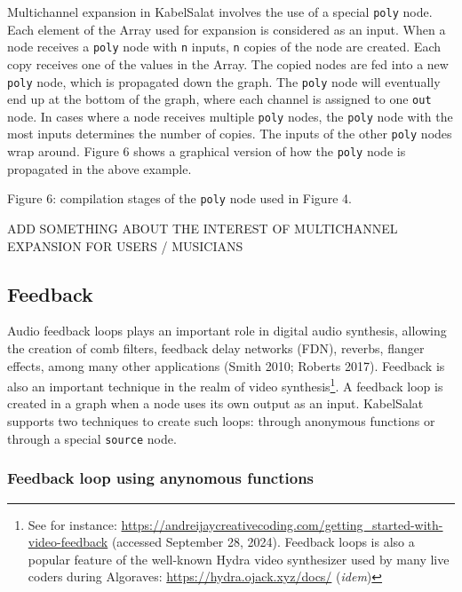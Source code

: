 \documentclass[11pt,]{article}
\makeatletter
\newcommand*\pandocbounded[1]{%
  \sbox\pandoc@box{#1}%
  \Gscale@div\@tempa{\textheight}{\dimexpr\ht\pandoc@box+\dp\pandoc@box\relax}%
  \Gscale@div\@tempb{\linewidth}{\wd\pandoc@box}%
  \ifdim\@tempb\p@<\@tempa\p@\let\@tempa\@tempb\fi%
  \ifdim\@tempa\p@<\p@\scalebox{\@tempa}{\usebox\pandoc@box}%
  \else\usebox{\pandoc@box}%
  \fi%
}
\makeatother
\begin{document}
Multichannel expansion in KabelSalat involves the use of a special
\texttt{poly} node. Each element of the Array used for expansion is
considered as an input. When a node receives a \texttt{poly} node with
\texttt{n} inputs, \texttt{n} copies of the node are created. Each copy
receives one of the values in the Array. The copied nodes are fed into a
new \texttt{poly} node, which is propagated down the graph. The
\texttt{poly} node will eventually end up at the bottom of the graph,
where each channel is assigned to one \texttt{out} node. In cases where
a node receives multiple \texttt{poly} nodes, the \texttt{poly} node
with the most inputs determines the number of copies. The inputs of the
other \texttt{poly} nodes wrap around. Figure 6 shows a graphical
version of how the \texttt{poly} node is propagated in the above
example.

\pandocbounded{\texttt{[image: images/mch.png]}} Figure
6: compilation stages of the \texttt{poly} node used in Figure 4.

ADD SOMETHING ABOUT THE INTEREST OF MULTICHANNEL EXPANSION FOR USERS /
MUSICIANS

\subsection{Feedback}\label{feedback}

Audio feedback loops plays an important role in digital audio synthesis,
allowing the creation of comb filters, feedback delay networks (FDN),
reverbs, flanger effects, among many other applications (Smith 2010;
Roberts 2017). Feedback is also an important technique in the realm of
video synthesis\footnote{See for instance:
  \url{https://andreijaycreativecoding.com/getting_started-with-video-feedback}
  (accessed September 28, 2024). Feedback loops is also a popular
  feature of the well-known Hydra video synthesizer used by many live
  coders during Algoraves: \url{https://hydra.ojack.xyz/docs/}
  (\emph{idem})}. A feedback loop is created in a graph when a node uses
its own output as an input. KabelSalat supports two techniques to create
such loops: through anonymous functions or through a special
\texttt{source} node.

\newpage

\subsubsection{Feedback loop using anynomous
functions}\label{feedback-loop-using-anynomous-functions}
\end{document}
